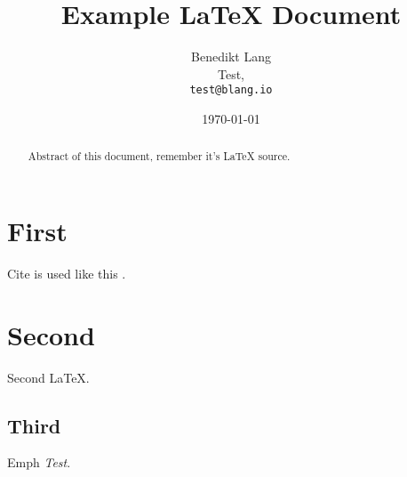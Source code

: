 \documentclass{article}
\begin{document}
\title{Example \LaTeX{} Document}
\author{Benedikt Lang\\
        Test,\\
		\texttt{test@blang.io}}
\date{\today}
\maketitle

\begin{abstract}
Abstract of this document, remember it's \LaTeX{} source.
\end{abstract}

\section{First}
Cite is used like this \cite{small}.

\section{Second}
Second \LaTeX{}.

\subsection{Third}
Emph \emph{Test}.
\end{document}
